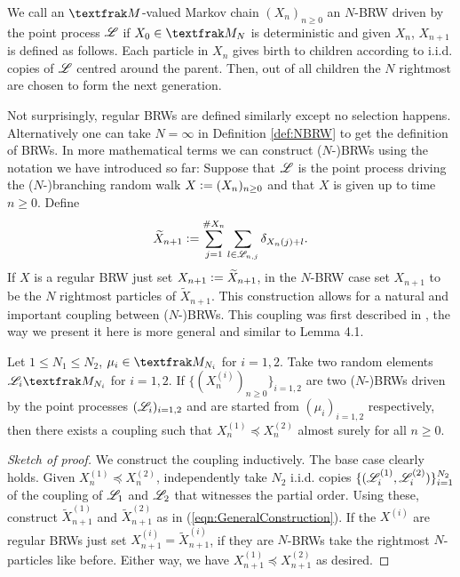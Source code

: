 \begin{definition}[$N$-BRW]\label{def:NBRW}
We call an $\frak{M}$-valued Markov chain $(X_n)_{n \geq 0}$ an $N$-BRW driven by the point process $\mathscr{L}$ if $X_0 \in \frak{M}_N$ is deterministic and given $X_n$, $X_{n+1}$ is defined as follows. Each particle in $X_n$ gives birth to children according to i.i.d. copies of $\mathscr{L}$ centred around the parent. Then, out of all children the $N$ rightmost are chosen to form the next generation. 
\end{definition}

Not surprisingly, regular BRWs are defined similarly except no selection happens. Alternatively one can take $N = \infty$ in Definition \ref{def:NBRW} to get the definition of BRWs. In more mathematical terms we can construct ($N$-)BRWs using the notation we have introduced so far: Suppose that $\mathscr{L}$ is the point process driving the ($N$-)branching random walk $X \vcentcolon= (X_n)_{n\geq0}$ and that $X$ is given up to time $n\geq0$. Define 
\begin{equation}\label{eqn:GeneralConstruction}
\widetilde{X}_{n+1} \vcentcolon= \sum\limits^{\# X_n}_{j=1} \sum\limits_{l \in \mathscr{L}_{n, j}} \delta_{X_n(j) +  l}. 
\end{equation}
If $X$ is a regular BRW just set $X_{n+1} \vcentcolon= \widetilde{X}_{n+1}$, in the $N$-BRW case set $X_{n+1}$ to be the $N$ rightmost particles of $\widetilde{X}_{n+1}$. This construction allows for a natural and important coupling between ($N$-)BRWs. This coupling was first described in \cite{exp_tails}, the way we present it here is more general and similar to \cite{mallein2018n} Lemma 4.1.

\begin{lemma}\label{lem:monotonicity}
Let $1 \leq N_1 \leq N_2$, $\mu_i \in \frak{M}_{N_i}$ for $i=1,2$. Take two random elements $\scr{L}_i \frak{M}_{N_i}$ for $i = 1,2$. If $\{(X^{(i)}_n)_{n\geq0}\}_{i=1,2}$ are two ($N$-)BRWs driven by the point processes $(\mathscr{L}_i)_{i = 1,2}$ and are started from $(\mu_i)_{i = 1,2}$ respectively, then there exists a coupling such that $X^{(1)}_n \preceq X^{(2)}_n$ almost surely for all $n \geq 0$. 
\end{lemma}

\begin{proof}[Sketch of proof]
We construct the coupling inductively. The base case clearly holds. Given $X^{(1)}_n \preceq X^{(2)}_n$, independently take $N_2$ i.i.d. copies $\{(\mathscr{L}^{(1)}_i, \mathscr{L}^{(2)}_i)\}^{N_2}_{i=1}$ of the coupling of $\mathscr{L}_1$ and $\mathscr{L}_2$ that witnesses the partial order. Using these, construct $\widetilde{X}^{(1)}_{n+1}$ and $\widetilde{X}^{(2)}_{n+1}$ as in (\ref{eqn:GeneralConstruction}). If the $X^{(i)}$ are regular BRWs just set $X^{(i)}_{n+1} = \widetilde{X}^{(i)}_{n+1}$, if they are $N$-BRWs take the rightmost $N$-particles like before. Either way, we have $X^{(1)}_{n+1} \preceq X^{(2)}_{n+1}$ as desired. 
\end{proof}	



